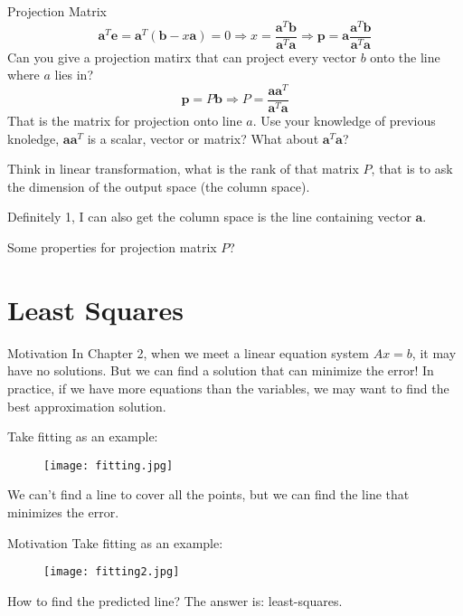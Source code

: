 \documentclass{beamer}
\begin{document}
\begin{frame}{Projection Matrix}
    \begin{equation*}
        \mathbf{a}^T\mathbf{e}=\mathbf{a}^T\left( \mathbf{b}-x\mathbf{a} \right) =0\Rightarrow x=\frac{\mathbf{a}^T\mathbf{b}}{\mathbf{a}^T\mathbf{a}}\Rightarrow \mathbf{p}=\mathbf{a}\frac{\mathbf{a}^T\mathbf{b}}{\mathbf{a}^T\mathbf{a}}
    \end{equation*}
Can you give a projection matirx that can project every vector $b$ onto the line where $a$ lies in?
\begin{equation*}
    \mathbf{p}=P\mathbf{b}\Rightarrow P=\frac{\mathbf{aa}^T}{\mathbf{a}^T\mathbf{a}}
\end{equation*}
That is the matrix for projection onto line $a$. Use your knowledge of previous knoledge, $\mathbf{aa}^T$ is a scalar, vector or matrix? What about $\mathbf{a}^T\mathbf{a}$?

\vspace{3pt}
Think in linear transformation, what is the rank of that matrix $P$, that is to ask the dimension of the output space (the column space).

\vspace{3pt}
Definitely 1, I can also get the column space is the line containing vector $\mathbf{a}$.

\vspace{3pt}
Some properties for projection matrix $P$?
\end{frame}

\section{Least Squares}
\begin{frame}{Motivation}
In Chapter 2, when we meet a linear equation system $Ax=b$, it may have no solutions. But we can find a solution that can minimize the error! In practice, if we have more equations than the variables, we may want to find the best approximation solution.

\vspace{3pt}
Take fitting as an example:
\begin{figure}
    \centering
    \texttt{[image: fitting.jpg]}
\end{figure}
We can't find a line to cover all the points, but we can find the line that minimizes the error.
\end{frame}

\begin{frame}{Motivation}
\vspace{3pt}
Take fitting as an example:
\begin{figure}
    \centering
    \texttt{[image: fitting2.jpg]}
\end{figure}

How to find the predicted line? The answer is: least-squares.
\end{frame}
\end{document}
